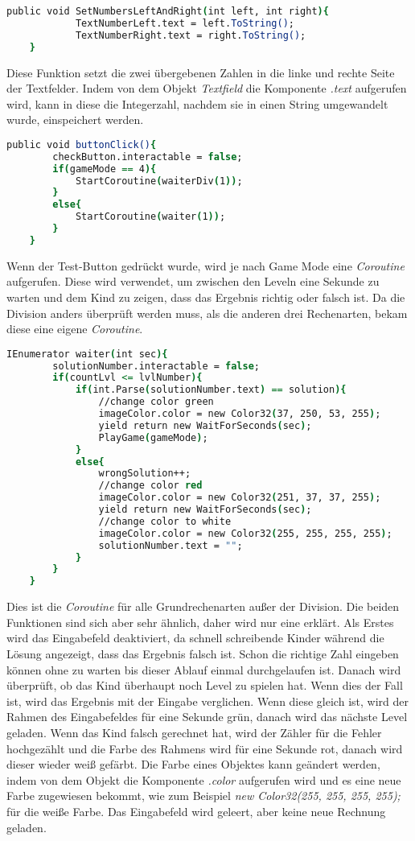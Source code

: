 \begin{lstlisting}[language=csh, caption={MathOperations.cs SetTextLeftAndRight-Funktion}]
	public void SetNumbersLeftAndRight(int left, int right){
			TextNumberLeft.text = left.ToString();
			TextNumberRight.text = right.ToString();
	}
\end{lstlisting}
Diese Funktion setzt die zwei übergebenen Zahlen in die linke und rechte Seite der Textfelder. Indem von dem Objekt \textit{Textfield} die Komponente \textit{.text} aufgerufen wird, kann in diese die Integerzahl, nachdem sie in einen String umgewandelt wurde, einspeichert werden.\\
\begin{lstlisting}[language=csh, caption={MathOperations.cs ButtonClick-Funktion}]
	public void buttonClick(){
		checkButton.interactable = false;
		if(gameMode == 4){
			StartCoroutine(waiterDiv(1));
		}
		else{
			StartCoroutine(waiter(1));
		}
	}
\end{lstlisting}
Wenn der Test-Button gedrückt wurde, wird je nach Game Mode eine \textit{Coroutine} aufgerufen. Diese wird verwendet, um zwischen den Leveln eine Sekunde zu warten und dem Kind zu zeigen, dass das Ergebnis richtig oder falsch ist. Da die Division anders überprüft werden muss, als die anderen drei Rechenarten, bekam diese eine eigene \textit{Coroutine}.\\
\begin{lstlisting}[language=csh, caption={MathOperations.cs waiter-Coroutine}]
	IEnumerator waiter(int sec){
		solutionNumber.interactable = false;
		if(countLvl <= lvlNumber){
			if(int.Parse(solutionNumber.text) == solution){
				//change color green
				imageColor.color = new Color32(37, 250, 53, 255);
				yield return new WaitForSeconds(sec);
				PlayGame(gameMode);
			}
			else{
				wrongSolution++;
				//change color red
				imageColor.color = new Color32(251, 37, 37, 255);
				yield return new WaitForSeconds(sec);
				//change color to white
				imageColor.color = new Color32(255, 255, 255, 255);
				solutionNumber.text = "";
			}
		}
	}
\end{lstlisting}
Dies ist die \textit{Coroutine} für alle Grundrechenarten außer der Division. Die beiden Funktionen sind sich aber sehr ähnlich, daher wird nur eine erklärt. Als Erstes wird das Eingabefeld deaktiviert, da schnell schreibende Kinder während die Lösung angezeigt, dass das Ergebnis falsch ist. Schon die richtige Zahl eingeben können ohne zu warten bis dieser Ablauf einmal durchgelaufen ist. Danach wird überprüft, ob das Kind überhaupt noch Level zu spielen hat. Wenn dies der Fall ist, wird das Ergebnis mit der Eingabe verglichen. Wenn diese gleich ist, wird der Rahmen des Eingabefeldes für eine Sekunde grün, danach wird das nächste Level geladen. Wenn das Kind falsch gerechnet hat, wird der Zähler für die Fehler hochgezählt und die Farbe des Rahmens wird für eine Sekunde rot, danach wird dieser wieder weiß gefärbt. Die Farbe eines Objektes kann geändert werden, indem von dem Objekt die Komponente \textit{.color} aufgerufen wird und es eine neue Farbe zugewiesen bekommt, wie zum Beispiel \textit{new Color32(255, 255, 255, 255);} für die weiße Farbe. Das Eingabefeld wird geleert, aber keine neue Rechnung geladen.\\
